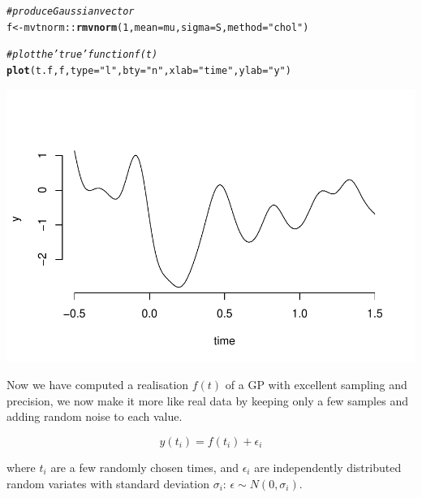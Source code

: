 \documentclass[a4paper, 11pt, amsmath, graphicx]{article}\usepackage[]{graphicx}\usepackage[]{color}
\makeatletter
\def\maxwidth{ %
  \ifdim\Gin@nat@width>\linewidth
    \linewidth
  \else
    \Gin@nat@width
  \fi
}
\newcommand{\hlnum}[1]{\textcolor[rgb]{0.686,0.059,0.569}{#1}}%
\newcommand{\hlstr}[1]{\textcolor[rgb]{0.192,0.494,0.8}{#1}}%
\newcommand{\hlcom}[1]{\textcolor[rgb]{0.678,0.584,0.686}{\textit{#1}}}%
\newcommand{\hlopt}[1]{\textcolor[rgb]{0,0,0}{#1}}%
\newcommand{\hlstd}[1]{\textcolor[rgb]{0.345,0.345,0.345}{#1}}%
\newcommand{\hlkwb}[1]{\textcolor[rgb]{0.69,0.353,0.396}{#1}}%
\newcommand{\hlkwc}[1]{\textcolor[rgb]{0.333,0.667,0.333}{#1}}%
\newcommand{\hlkwd}[1]{\textcolor[rgb]{0.737,0.353,0.396}{\textbf{#1}}}%
\newenvironment{kframe}{%
 \def\at@end@of@kframe{}%
 \ifinner\ifhmode%
  \def\at@end@of@kframe{\end{minipage}}%
  \begin{minipage}{\columnwidth}%
 \fi\fi%
 \def\FrameCommand##1{\hskip\@totalleftmargin \hskip-\fboxsep
 \colorbox{shadecolor}{##1}\hskip-\fboxsep
     \hskip-\linewidth \hskip-\@totalleftmargin \hskip\columnwidth}%
 \MakeFramed {\advance\hsize-\width
   \@totalleftmargin\z@ \linewidth\hsize
   \@setminipage}}%
 {\par\unskip\endMakeFramed%
 \at@end@of@kframe}
\newenvironment{knitrout}{}{} %
\makeatother
\begin{document}
\begin{knitrout}
\color{fgcolor}\begin{kframe}
\begin{alltt}
\hlcom{# produce Gaussian vector}
\hlstd{f} \hlkwb{<-} \hlstd{mvtnorm}\hlopt{::}\hlkwd{rmvnorm}\hlstd{(}\hlnum{1}\hlstd{,} \hlkwc{mean} \hlstd{= mu,} \hlkwc{sigma} \hlstd{= S,} \hlkwc{method} \hlstd{=} \hlstr{"chol"}\hlstd{)}

\hlcom{# plot the 'true' function f(t)}
\hlkwd{plot}\hlstd{(t.f, f,} \hlkwc{type} \hlstd{=} \hlstr{"l"}\hlstd{,} \hlkwc{bty} \hlstd{=} \hlstr{"n"}\hlstd{,} \hlkwc{xlab} \hlstd{=} \hlstr{"time"}\hlstd{,} \hlkwc{ylab} \hlstd{=} \hlstr{"y"}\hlstd{)}
\end{alltt}
\end{kframe}

{\centering \includegraphics[width=\maxwidth]{figure/unnamed-chunk-4-1} 

}



\end{knitrout}

Now we have computed a realisation $f(t)$ of a GP with excellent sampling and precision, we now make it more like real data by keeping only a few samples and adding random noise to each value.

\begin{equation}
  y(t_i) = f(t_i) + \epsilon_i
\end{equation}

where $t_i$ are a few randomly chosen times, and $\epsilon_i$ are independently distributed random variates with standard deviation $\sigma_i$: $\epsilon \sim N(0, \sigma_i)$.
\end{document}
